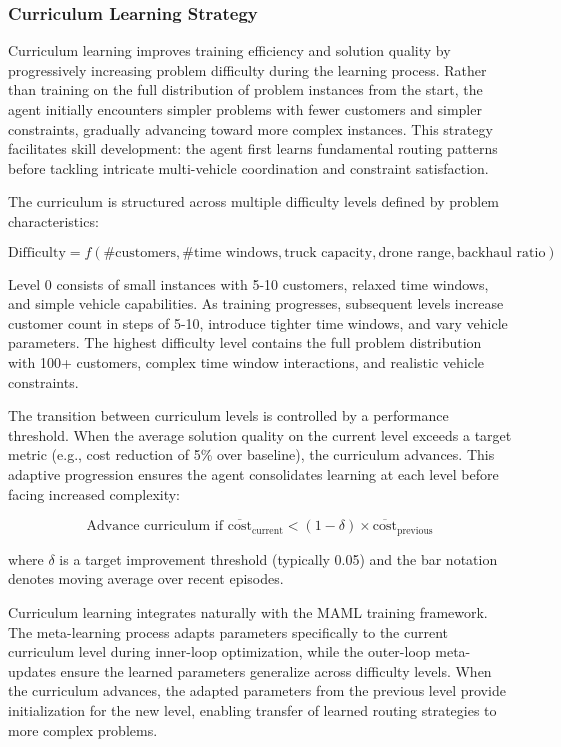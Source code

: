 \subsubsection{Curriculum Learning Strategy}

Curriculum learning improves training efficiency and solution quality by progressively increasing problem difficulty during the learning process. Rather than training on the full distribution of problem instances from the start, the agent initially encounters simpler problems with fewer customers and simpler constraints, gradually advancing toward more complex instances. This strategy facilitates skill development: the agent first learns fundamental routing patterns before tackling intricate multi-vehicle coordination and constraint satisfaction.

The curriculum is structured across multiple difficulty levels defined by problem characteristics:

\begin{equation}
\text{Difficulty} = f(\text{\# customers}, \text{\# time windows}, \text{truck capacity}, \text{drone range}, \text{backhaul ratio})
\end{equation}

Level 0 consists of small instances with 5-10 customers, relaxed time windows, and simple vehicle capabilities. As training progresses, subsequent levels increase customer count in steps of 5-10, introduce tighter time windows, and vary vehicle parameters. The highest difficulty level contains the full problem distribution with 100+ customers, complex time window interactions, and realistic vehicle constraints.

The transition between curriculum levels is controlled by a performance threshold. When the average solution quality on the current level exceeds a target metric (e.g., cost reduction of 5\% over baseline), the curriculum advances. This adaptive progression ensures the agent consolidates learning at each level before facing increased complexity:

\begin{equation}
\text{Advance curriculum if } \overline{\text{cost}}_{\text{current}} < (1 - \delta) \times \overline{\text{cost}}_{\text{previous}}
\end{equation}

where $\delta$ is a target improvement threshold (typically 0.05) and the bar notation denotes moving average over recent episodes.

Curriculum learning integrates naturally with the MAML training framework. The meta-learning process adapts parameters specifically to the current curriculum level during inner-loop optimization, while the outer-loop meta-updates ensure the learned parameters generalize across difficulty levels. When the curriculum advances, the adapted parameters from the previous level provide initialization for the new level, enabling transfer of learned routing strategies to more complex problems.

